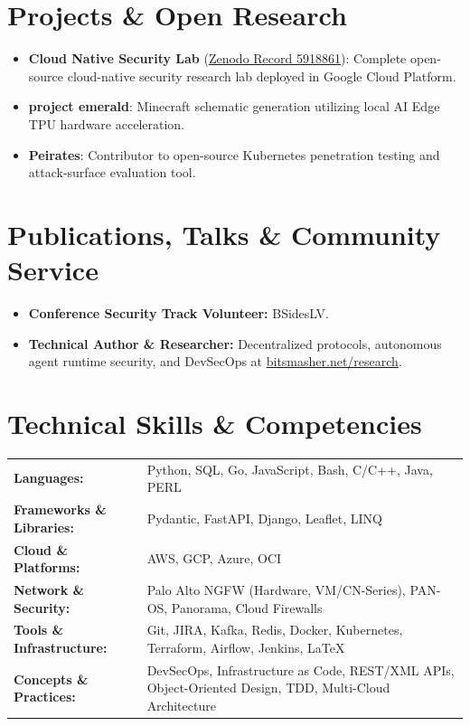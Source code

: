 \documentclass[10pt, a4paper]{article}
\begin{document}
\section{Projects \& Open Research}
\begin{itemize}
    \item \textbf{Cloud Native Security Lab} (\href{https://zenodo.org/records/5918861}{Zenodo Record 5918861}): Complete open-source cloud-native security research lab deployed in Google Cloud Platform.
    \item \textbf{project emerald}: Minecraft schematic generation utilizing local AI Edge TPU hardware acceleration.
    \item \textbf{Peirates}: Contributor to open-source Kubernetes penetration testing and attack-surface evaluation tool.
\end{itemize}

\section{Publications, Talks \& Community Service}
\begin{itemize}
    \item \textbf{Conference Security Track Volunteer:} BSidesLV.
    \item \textbf{Technical Author \& Researcher:} Decentralized protocols, autonomous agent runtime security, and DevSecOps at \href{https://www.bitsmasher.net/research/}{bitsmasher.net/research}.
\end{itemize}

\section{Technical Skills \& Competencies}
\noindent
\begin{tabularx}{\textwidth}{@{}p{4.8cm} X@{}}
\textbf{Languages:} & Python, SQL, Go, JavaScript, Bash, C/C++, Java, PERL \\
\textbf{Frameworks \& Libraries:} & Pydantic, FastAPI, Django, Leaflet, LINQ \\
\textbf{Cloud \& Platforms:} & AWS, GCP, Azure, OCI \\
\textbf{Network \& Security:} & Palo Alto NGFW (Hardware, VM/CN-Series), PAN-OS, Panorama, Cloud Firewalls \\
\textbf{Tools \& Infrastructure:} & Git, JIRA, Kafka, Redis, Docker, Kubernetes, Terraform, Airflow, Jenkins, \LaTeX \\
\textbf{Concepts \& Practices:} & DevSecOps, Infrastructure as Code, REST/XML APIs, Object-Oriented Design, TDD, Multi-Cloud Architecture
\end{tabularx}
\end{document}
